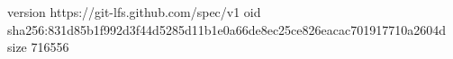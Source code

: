 version https://git-lfs.github.com/spec/v1
oid sha256:831d85b1f992d3f44d5285d11b1e0a66de8ec25ce826eacac701917710a2604d
size 716556
